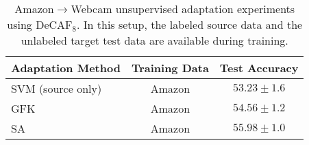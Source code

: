 \begin{table*}
\centering
\begin{tabular}{lcc}
\toprule
Adaptation Method & Training Data & Test Accuracy \\
\midrule
SVM (source only) & Amazon & $53.23 \pm 1.6$ \\
\midrule
GFK \cite{gong-cvpr12} & Amazon & $54.56 \pm 1.2$ \\
SA \cite{sa} & Amazon & $55.98 \pm 1.0$ \\
\bottomrule
\end{tabular}

\caption{Amazon$\rightarrow$Webcam unsupervised adaptation experiments using
  DeCAF$_8$. In this setup, the labeled source data and the unlabeled target
  test data are available during training.}
\label{tab:amazon_fc8_unsup}
\end{table*}
